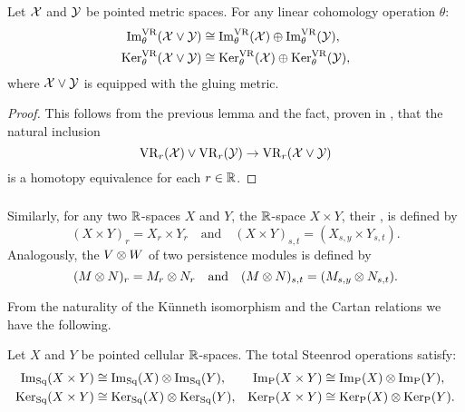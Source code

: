 \medskip\theorem
Let $\mathcal{X}$ and $\mathcal{Y}$ be pointed metric spaces.
For any linear cohomology operation $\theta$:
\begin{align*}
	\operatorname{Im}_\theta^{\mathrm{VR}}(\mathcal{X} \vee \mathcal{Y}) &\cong \operatorname{Im}_\theta^{\mathrm{VR}}(\mathcal{X}) \oplus \operatorname{Im}_\theta^{\mathrm{VR}}(\mathcal{Y}), \\
	\operatorname{Ker}_\theta^{\mathrm{VR}}(\mathcal{X} \vee \mathcal{Y}) &\cong \operatorname{Ker}_\theta^{\mathrm{VR}}(\mathcal{X}) \oplus \operatorname{Ker}_\theta^{\mathrm{VR}}(\mathcal{Y}),
\end{align*}
where \(\mathcal{X} \vee \mathcal{Y}\) is equipped with the gluing metric.

\begin{proof}
	This follows from the previous lemma and the fact, proven in \cite[Prop.~1]{adamaszek2020homotopy}, that the natural inclusion
	\[
	\mathrm{VR}_r(\mathcal{X}) \vee \mathrm{VR}_r(\mathcal{Y}) \to \mathrm{VR}_r(\mathcal{X} \vee \mathcal{Y})
	\]
	is a homotopy equivalence for each $r \in \mathbb{R}$.
\end{proof}

\subsubsection{}

Similarly, for any two $\mathbb{R}$-spaces $X$ and $Y$, the $\mathbb{R}$-space $X \times Y$, their , is defined by
\[
(X \times Y)_r = X_r \times Y_r \quad\text{and}\quad (X \times Y)_{s,t} = (X_{s,y} \times Y_{s,t}).
\]
Analogously, the  \(V \otimes W\) of two persistence modules is defined by
\[
(M \otimes N)_r = M_r \otimes N_r \quad\text{and}\quad (M \otimes N)_{s,t} = (M_{s,y} \otimes N_{s,t}).
\]


From the naturality of the K\"unneth isomorphism and the Cartan relations we have the following.

\medskip\lemma
Let $X$ and $Y$ be pointed cellular $\mathbb{R}$-spaces.
The total Steenrod operations satisfy:
\begin{align*}
	\operatorname{Im}_{\mathrm{Sq}}(X \times Y) &\cong \operatorname{Im}_{\mathrm{Sq}}(X) \otimes \operatorname{Im}_{\mathrm{Sq}}(Y),
	&\operatorname{Im}_{\mathrm{P}}(X \times Y) &\cong \operatorname{Im}_{\mathrm{P}}(X) \otimes \operatorname{Im}_{\mathrm{P}}(Y),\\
	\operatorname{Ker}_{\mathrm{Sq}}(X \times Y) &\cong \operatorname{Ker}_{\mathrm{Sq}}(X) \otimes \operatorname{Ker}_{\mathrm{Sq}}(Y),
	&\operatorname{Ker}_{\mathrm{P}}(X \times Y) &\cong \operatorname{Ker}_{\mathrm{P}}(X) \otimes \operatorname{Ker}_{\mathrm{P}}(Y).
\end{align*}

\subsubsection{}

